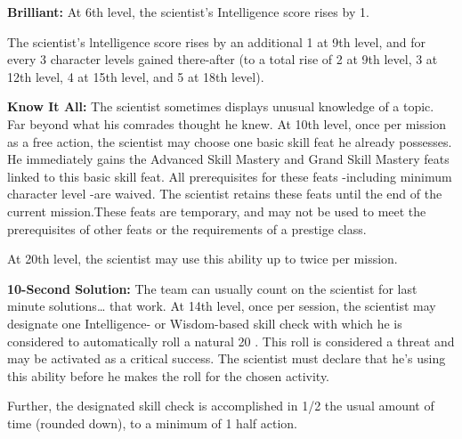 \textbf{Brilliant:} At 6th level, the scientist's Intelligence score rises by 1.

The scientist's lntelligence score rises by an additional 1 at 9th level, and for every 3 character levels gained there-after (to a total rise of 2 at 9th level, 3 at 12th level, 4 at 15th level, and 5 at 18th level).

\textbf{Know It All:} The scientist sometimes displays unusual knowledge of a topic. Far beyond what his comrades thought he knew. At 10th level, once per mission as a free action, the scientist may choose one basic skill feat he already possesses. He immediately gains the Advanced Skill Mastery and Grand Skill Mastery feats linked to this basic skill feat. All prerequisites for these feats -including minimum character level -are waived. The scientist retains these feats until the end of the current mission.These feats are temporary, and may not be used to meet the prerequisites of other feats or the requirements of a prestige class.

At 20th level, the scientist may use this ability up to twice per mission.

\textbf{10-Second Solution:} The team can usually count on the scientist for last minute solutions… that work. At 14th level, once per session, the scientist may designate one Intelligence- or Wisdom-based skill check with which he is considered to automatically roll a natural 20 . This roll is considered a threat and may be activated as a critical success. The scientist must declare that he's using this ability before he makes the roll for the chosen activity.

Further, the designated skill check is accomplished in 1/2 the usual amount of time (rounded down), to a minimum of 1 half action.

